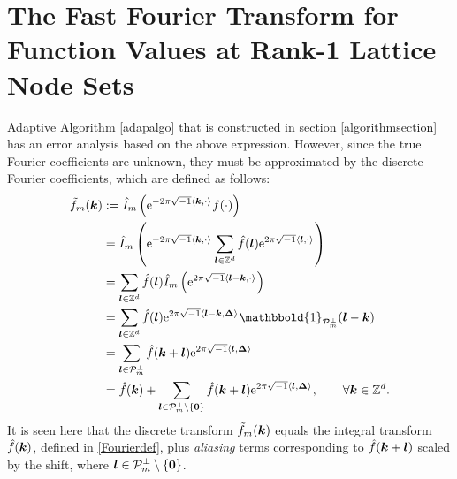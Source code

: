 \documentclass[graybox]{svmult}
\newcommand{\Z}{\mathbb{Z}} %
\newcommand{\bszero}{\boldsymbol{0}} %
\newcommand{\bsDelta}{\boldsymbol{\Delta}}    %
\newcommand{\ind}{\mathbbold{1}}
\begin{document}
\section{The Fast Fourier Transform for Function Values at Rank-1 Lattice Node Sets}\label{FFT}

Adaptive Algorithm \ref{adapalgo} that is constructed in section \ref{algorithmsection} has an error analysis based on the above expression.  However, since the true Fourier coefficients are unknown, they must be approximated by the discrete Fourier coefficients, which are defined as follows:
\begin{subequations} \label{tfdefalias}
\begin{align}
\tf_m(\bsk)
&:= \hI_m\left( \E^{-2 \pi \sqrt{-1} \ip{\bsk}{\cdot}} f(\cdot) \right) \label{tfdef}\\
\nonumber
& = \hI_m\left( \E^{-2 \pi \sqrt{-1} \ip{\bsk}{\cdot}} \sum_{\bsl \in \Z^d} \hf(\bsl) \E^{2 \pi \sqrt{-1} \ip{\bsl}{\cdot}}  \right) \\
\nonumber
& = \sum_{\bsl \in \Z^d} \hf(\bsl) \hI_m\left( \E^{2 \pi \sqrt{-1} \ip{\bsl-\bsk}{\cdot}}  \right) \\
\nonumber
& = \sum_{\bsl \in \Z^d} \hf(\bsl) \E^{2 \pi \sqrt{-1} \ip{\bsl - \bsk}{\bsDelta}} \ind_{\cp_m^{\perp}}(\bsl - \bsk) \\
\nonumber
& = \sum_{\bsl \in \cp^{\perp}_m} \hf(\bsk+\bsl) \E^{2 \pi \sqrt{-1} \ip{\bsl }{\bsDelta}} \\
&= \hf(\bsk) + \sum_{\bsl \in \cp^{\perp}_m\setminus \{\bszero\}} \hf(\bsk+\bsl) \E^{2 \pi \sqrt{-1} \ip{\bsl }{\bsDelta}}, \qquad \forall \bsk \in \Z^d. \label{tfassum}
\end{align}
\end{subequations}
It is seen here that the discrete transform $\tilde{f}_m(\boldsymbol{k})$ equals the integral transform $\hat{f}(\boldsymbol{k})$, defined in \eqref{Fourierdef}, plus \emph{aliasing} terms corresponding to $\hat{f}(\boldsymbol{k}+\boldsymbol{l})$ scaled by the shift, where $\bsl \in \cp_{m}^{\perp}\setminus \left\{\bszero\right\}$.
\end{document}
